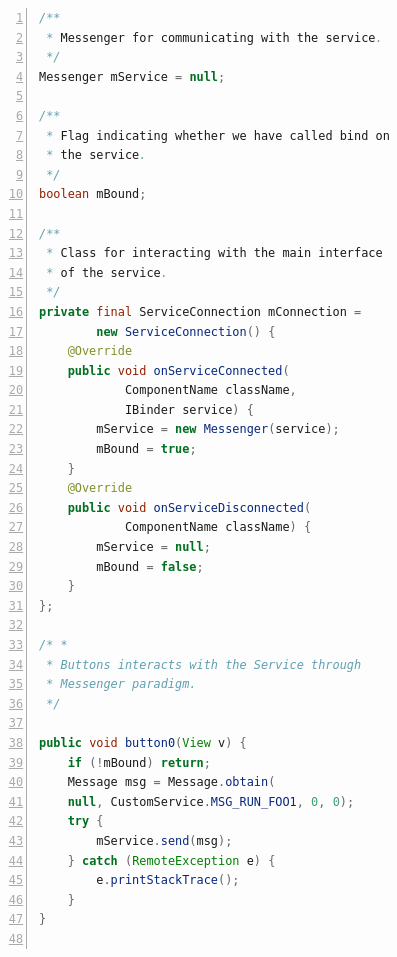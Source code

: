 \documentclass[a4paper,10pt]{article}
\begin{document}
\begin{multicols}{2}
\begin{lstlisting}[language=Java,
		   columns=fullflexible,
		   showstringspaces=false,
		   xleftmargin=15pt,
		   frame = l,
		   numbers=left,
		   commentstyle=\color{gray}\upshape,
		   caption=Tutorial3Activity.java - message handling,
		   label=lst:tut3-activity]
/**
 * Messenger for communicating with the service.
 */
Messenger mService = null;

/** 
 * Flag indicating whether we have called bind on
 * the service. 
 */
boolean mBound;

/**
 * Class for interacting with the main interface
 * of the service.
 */
private final ServiceConnection mConnection =
		new ServiceConnection() {
	@Override
	public void onServiceConnected(
			ComponentName className,
			IBinder service) {
		mService = new Messenger(service);
		mBound = true;
	}
	@Override
	public void onServiceDisconnected(
			ComponentName className) {
		mService = null;
		mBound = false;
	}
};

/* *
 * Buttons interacts with the Service through
 * Messenger paradigm.
 */

public void button0(View v) {
	if (!mBound) return;
	Message msg = Message.obtain(
	null, CustomService.MSG_RUN_FOO1, 0, 0);
	try {
		mService.send(msg);
	} catch (RemoteException e) {
		e.printStackTrace();
	}
}


\end{lstlisting}
\end{multicols}
\end{document}

